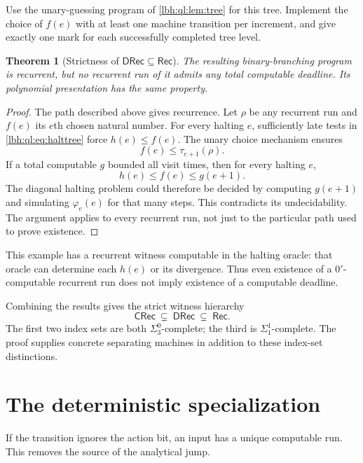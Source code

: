 \documentclass[11pt,letterpaper]{article}
\newtheorem{theorem}{Theorem}[section]
\theoremstyle{definition}
\theoremstyle{remark}
\newcommand{\Rec}{\mathsf{Rec}}
\newcommand{\CRec}{\mathsf{CRec}}
\newcommand{\DRec}{\mathsf{DRec}}
\newcommand{\1}{\mathbf 1}
\begin{document}
Use the unary-guessing program of \cref{lbh:ql:lem:tree} for this tree. Implement the
choice of $f(e)$ with at least one machine transition per increment, and give
exactly one mark for each successfully completed tree level.
\begin{theorem}[Strictness of $\DRec\subseteq\Rec$]
\label{lbh:ql:thm:secondseparation}
The resulting binary-branching program is recurrent, but no recurrent run of
it admits any total computable deadline. Its polynomial presentation has the
same property.
\end{theorem}
\begin{proof}
The path described above gives recurrence. Let $\rho$ be any recurrent run
and $f(e)$ its $e$th chosen natural number. For every halting $e$, sufficiently
late tests in \eqref{lbh:ql:eq:halttree} force $h(e)\leq f(e)$. The unary choice
mechanism ensures
\[
 f(e)\leq\tau_{e+1}(\rho).
\]
If a total computable $g$ bounded all visit times, then for every halting $e$,
\[
 h(e)\leq f(e)\leq g(e+1).
\]
The diagonal halting problem could therefore be decided by computing
$g(e+1)$ and simulating $\varphi_e(e)$ for that many steps. This contradicts
its undecidability. The argument applies to every recurrent run, not just to
the particular path used to prove existence.
\end{proof}
This example has a recurrent witness computable in the halting oracle: that
oracle can determine each $h(e)$ or its divergence. Thus even existence of a
$0'$-computable recurrent run does not imply existence of a computable deadline.

Combining the results gives the strict witness hierarchy
\[
 \boxed{\CRec\ \subsetneq\ \DRec\ \subsetneq\ \Rec.}
\]
The first two index sets are both $\Sigma^0_3$-complete; the third is
$\Sigma^1_1$-complete. The proof supplies concrete separating machines in
addition to these index-set distinctions.
\section{The deterministic specialization}\label{lbh:sec:deterministic}
If the transition ignores the action bit, an input has a unique computable
run. This removes the source of the analytical jump.
\end{document}
